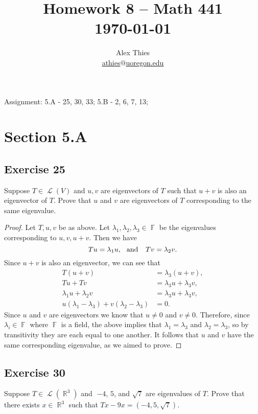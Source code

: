 \documentclass[letterpaper, 12pt]{amsart}
\DeclareMathOperator{\R}{\mathbb{R}}				%
\DeclareMathOperator{\F}{\mathbb{F}}				%
\DeclareMathOperator{\Ell}{\mathscr{L}}				%
\theoremstyle{definition}  							%
\begin{document}
	\title{Homework 8  -- Math 441 \\ \today}
	\author{Alex Thies \\ \href{mailto:athies@uoregon.edu}{\lowercase{athies$@$uoregon.edu}}}

	\maketitle

	Assignment: 5.A - 25, 30, 33; 5.B - 2, 6, 7, 13;

	\section*{Section 5.A}
		\subsection*{Exercise 25}
		Suppose $T \in \Ell(V)$ and $u,v$ are eigenvectors of $T$ such that $u + v$ is also an eigenvector of $T$. 
		Prove that $u$ and $v$ are eigenvectors of $T$ corresponding to the same eigenvalue.

		\begin{proof}
		Let $T,u,v$ be as above.
		Let $\lambda_{1},\lambda_{2},\lambda_{3} \in \F$ be the eigenvalues corresponding to $u,v,u+v$.
		Then we have $$Tu = \lambda_{1}u, \hspace{2.5mm} \text{and } \hspace{2.5mm} Tv = \lambda_{2}v.$$
		Since $u+v$ is also an eigenvector, we can see that
			\begin{align*}
				T(u+v) &= \lambda_{3}(u + v), \\
				Tu + Tv &= \lambda_{3}u + \lambda_{3}v, \\
				\lambda_{1}u + \lambda_{2}v &= \lambda_{3}u + \lambda_{3}v, \\
				u(\lambda_{1} - \lambda_{3}) + v(\lambda_{2} - \lambda_{3}) &= 0.
			\end{align*}
		Since $u$ and $v$ are eigenvectors we know that $u \neq 0$ and $v \neq 0$. 
		Therefore, since $\lambda_{i} \in \F$ where $\F$ is a field, the above implies that $\lambda_{1} = \lambda_{3}$ and $\lambda_{2} = \lambda_{3}$, so by transitivity they are each equal to one another.
		It follows that $u$ and $v$ have the same corresponding eigenvalue, as we aimed to prove.
		\end{proof}

		\subsection*{Exercise 30}
		Suppose $T \in \Ell(\R^{3})$ and 􏰋$-4$, $5$, and $\sqrt{7}$ are eigenvalues of $T$.
		Prove that there exists $x \in \R^{3}$ such that $Tx - 9x = (-4, 5, \sqrt{7})$.
\end{document}
